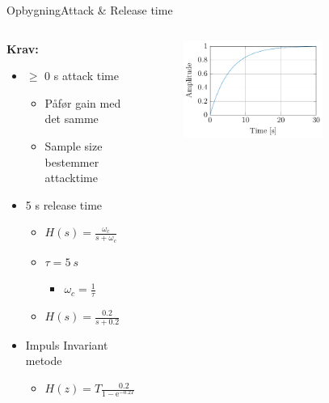\begin{frame}{Opbygning}{Attack \& Release time}
\begin{columns}
  \begin{column}{0.4\textwidth}
\textbf{Krav:}

\begin{itemize}
\item $\geq$ 0 s attack time
\begin{itemize}
\item Påfør gain med det samme
\item Sample size bestemmer attacktime
\end{itemize}
\item 5 s release time
\begin{itemize}
\item $H(s) = \frac{\omega_c}{s+\omega_c}$
\item $\tau = 5 \ s$
\begin{itemize}
\item $\omega_c=\frac{1}{\tau}$
\end{itemize}
\item $H(s) = \frac{0.2}{s+0.2}$
\end{itemize}
\item Impuls Invariant metode
\begin{itemize}
\item $H(z) = T\frac{0.2}{1-\text{e}^{-0.2T} z^{-1}}$
\end{itemize}
\end{itemize}

  \end{column}

  \begin{column}{0.6\textwidth}
\begin{figure}
\centering
\includegraphics[width=0.7\textwidth]{releaseTimeDigitalStep}
\end{figure}

  \end{column}
\end{columns}
\end{frame}
